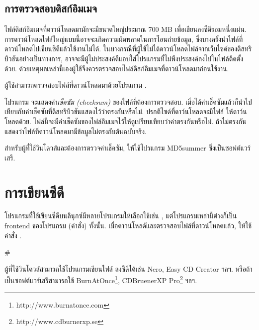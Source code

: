 \begin{thwbr}
\subsection{การตรวจสอบดิสก์อิมเมจ}
ไฟล์ดิสก์อิมเมจที่ดาวน์โหลดมามักจะมีขนาดใหญ่ประมาณ 700 MB เพื่อเขียนลงซีดีรอมหนึ่งแผ่น. การดาวน์โหลดไฟล์ใหญ่แบบนี้อาจจะเกิดความผิดพลาดในการโอนถ่ายข้อมูล, ซึ่งบางครั้งนำไฟล์ที่ดาวน์โหลดไปเขียนซีดีแล้วใช้งานไม่ได้. ในบางกรณีที่ผู้ใช้ไม่ได้ดาวน์โหลดไฟล์จากเว็บไซด์ของดิสทริบิวชันอย่างเป็นทางการ, อาจจะมีผู้ไม่ประสงค์ดีแอบใส่โปรแกรมที่ไม่พึงประสงค์ลงไปในไฟล์ติดตั้งด้วย. ด้วยเหตุผลเหล่านี้เองผู้ใช้จึงควรตรวจสอบไฟล์ดิสก์อิมเมจที่ดาวน์โหลดมาก่อนใช้งาน.

ผู้ใช้สามารถตรวจสอบไฟล์ที่ดาวน์โหลดมาด้วยโปรแกรม . %
%
โปรแกรม  จะแสดงค่า\emph{เช็คซัม (checksum)} ของไฟล์ที่ต้องการตรวจสอบ. เมื่อได้ค่าเช็คซัมแล้วก็นำไปเทียบกับค่าเช็คซัมที่ดิสทริบิวชันแสดงไว้ว่าตรงกันหรือไม่. ปรกติไซด์ที่ดาว์นโหลดจะมีไฟล์  ให้ดาว์นโหลดด้วย. ไฟล์นี้จะมีค่าเช็คซัมของไฟล์อิมเมจไว้ให้ดูเปรียบเทียบว่าค่าตรงกันหรือไม่. ถ้าไม่ตรงกันแสดงว่าไฟล์ที่ดาวน์โหลดมามีข้อมูลไม่ตรงกับต้นฉบับจริง. %


สำหรับผู้ที่ใช้วินโดวส์และต้องการตรวจค่าเช็คซัม, ให้ใช้โปรแกรม MD5summer \cite{md5summer} ซึ่งเป็นซอฟต์แวร์เสรี.

\section{การเขียนซีดี}
โปรแกรมที่ใช้เขียนซีดีบนลินุกซ์มีหลายโปรแกรมให้เลือกใช้เช่น ,  แต่โปรแกรมเหล่านี้ต่างก็เป็น frontend ของโปรแกรม (คำสั่ง)  ทั้งนั้น. เมื่อดาวน์โหลดัและตรวจสอบไฟล์ที่ดาวน์โหลดแล้ว, ให้ใช้คำสั่ง . 

\begin{MyVerbatim}
# 
\end{MyVerbatim} 

ผู้ที่ใช้วินโดวส์สามารถใช้โปรแกรมเขียนไฟล์  ลงซีดีได้เช่น Nero, Easy CD Creator ฯลฯ.  หรือถ้าเป็นซอฟต์แวร์เสรีสามารถใช้ BurnAtOnce\footnote{http://www.burnatonce.com}, CDBruenerXP Pro\footnote{http://www.cdburnerxp.se} ฯลฯ.

\end{thwbr}
